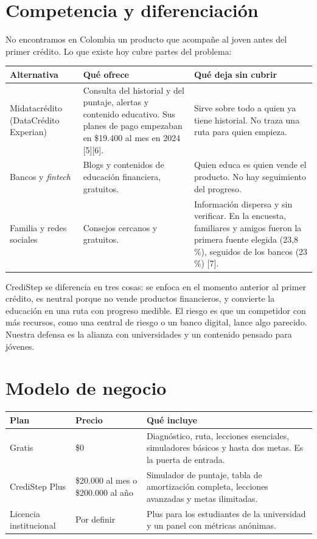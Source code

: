 \documentclass[11pt,a4paper]{article}
\begin{document}
\newpage
\section{Competencia y diferenciación}

No encontramos en Colombia un producto que acompañe al joven antes del primer crédito. Lo que existe hoy cubre partes del problema:

\begin{tabularx}{\textwidth}{P{2.9cm} Y Y}
  \toprule
  \textbf{Alternativa} & \textbf{Qué ofrece} & \textbf{Qué deja sin cubrir} \\
  \midrule
  Midatacrédito (DataCrédito Experian) & Consulta del historial y del puntaje, alertas y contenido educativo. Sus planes de pago empezaban en \$19.400 al mes en 2024 [5][6]. & Sirve sobre todo a quien ya tiene historial. No traza una ruta para quien empieza. \\
  Bancos y \textit{fintech} & Blogs y contenidos de educación financiera, gratuitos. & Quien educa es quien vende el producto. No hay seguimiento del progreso. \\
  Familia y redes sociales & Consejos cercanos y gratuitos. & Información dispersa y sin verificar. En la encuesta, familiares y amigos fueron la primera fuente elegida (23,8 \%), seguidos de los bancos (23 \%) [7]. \\
  \bottomrule
\end{tabularx}

CrediStep se diferencia en tres cosas: se enfoca en el momento anterior al primer crédito, es neutral porque no vende productos financieros, y convierte la educación en una ruta con progreso medible. El riesgo es que un competidor con más recursos, como una central de riesgo o un banco digital, lance algo parecido. Nuestra defensa es la alianza con universidades y un contenido pensado para jóvenes.

\section{Modelo de negocio}

\begin{tabularx}{\textwidth}{P{2.6cm} P{3.2cm} Y}
  \toprule
  \textbf{Plan} & \textbf{Precio} & \textbf{Qué incluye} \\
  \midrule
  Gratis & \$0 & Diagnóstico, ruta, lecciones esenciales, simuladores básicos y hasta dos metas. Es la puerta de entrada. \\
  CrediStep Plus & \$20.000 al mes o \$200.000 al año & Simulador de puntaje, tabla de amortización completa, lecciones avanzadas y metas ilimitadas. \\
  Licencia institucional & Por definir & Plus para los estudiantes de la universidad y un panel con métricas anónimas. \\
  \bottomrule
\end{tabularx}
\end{document}
